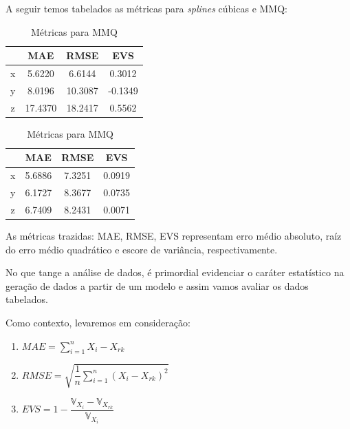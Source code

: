 \documentclass[12pt, a4paper]{article}
\begin{document}
    A seguir temos tabelados as métricas para \textit{splines} cúbicas e MMQ:
    
    \begin{table}[htbp]
        \centering
        \begin{minipage}{0.45\textwidth}
            \centering
            \caption{Métricas \textit{splines} cúbicas}
            \begin{tabular}{|c|c|c|c|}
                \hline
                  & MAE    & RMSE   & EVS     \\
                \hline
                x & 5.6220 & 6.6144 & 0.3012  \\ \hline
                y & 8.0196 & 10.3087 & -0.1349  \\ \hline
                z & 17.4370 & 18.2417 & 0.5562 \\ \hline
            \end{tabular}
        \end{minipage}%
        \hfill
        \begin{minipage}{0.45\textwidth}
            \centering
            \caption{Métricas para MMQ}
            \begin{tabular}{|c|c|c|c|}
                \hline
                  & MAE    & RMSE   & EVS    \\
                \hline
                x & 5.6886 & 7.3251 & 0.0919 \\ \hline
                y & 6.1727 & 8.3677 & 0.0735 \\ \hline
                z & 6.7409 & 8.2431 & 0.0071 \\ \hline
            \end{tabular}
        \end{minipage}
    \end{table}
    
    As métricas trazidas: MAE, RMSE, EVS representam erro médio absoluto, raíz do erro médio quadrático e escore de variância, respectivamente. 
    
    No que tange a análise de dados, é primordial evidenciar o caráter estatístico na geração de dados a partir de um modelo e assim vamos avaliar os dados tabelados.
    
    Como contexto, levaremos em consideração: 
    
    \begin{enumerate}
        \item $MAE = \sum_{i=1}^n X_i - X_{rk}$
        \item $RMSE = \sqrt{\dfrac{1}{n} \sum_{i=1}^n (X_i - X_{rk})^2}$
        \item $EVS = 1 - \dfrac{\mathbb{V}_{X_i} - \mathbb{V}_{X_{rk}}}{\mathbb{V}_{X_i}}$
    \end{enumerate}
    
\end{document}
